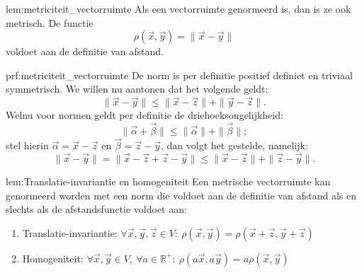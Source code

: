 \begin{lem}{lem:metriciteit_vectorruimte}
    Als een vectorruimte genormeerd is, dan is ze ook metrisch. De functie
    \begin{equation*}
        \rho(\vec{x},\vec{y}) = \|\vec{x} - \vec{y}\|
    \end{equation*}
    voldoet aan de definitie van afstand.
\end{lem}

\newpage

\begin{prf}{prf:metriciteit_vectorruimte}
    De norm is per definitie positief definiet en triviaal symmetrisch. We willen nu aantonen dat het volgende geldt:
    \begin{equation*}
        \| \vec{x} - \vec{y} \| \leq \| \vec{x} - \vec{z} \| + \| \vec{y} - \vec{z} \|.
    \end{equation*}
    Welnu voor normen geldt per definitie de driehoeksongelijkheid:
    \begin{equation*}
        \|\vec{\alpha} + \vec{\beta}\| \leq \|\vec{\alpha}\| + \|\vec{\beta}\|;
    \end{equation*}
    stel hierin $\vec{\alpha} = \vec{x} - \vec{z}$ en $\vec{\beta} = \vec{z} - \vec{y}$, dan volgt het gestelde, namelijk:
    \begin{equation*}
        \|\vec{x} - \vec{y}\| = \|\vec{x} - \vec{z} + \vec{z} - \vec{y}\| \leq \|\vec{x} - \vec{z}\| + \|\vec{z} - \vec{y}\|.
    \end{equation*}
    \vspace{-0.5cm}
\end{prf}

\begin{lem}{lem:Translatie-invariantie en homogeniteit}
    Een metrische vectorruimte kan genormeerd worden met een norm die voldoet aan de definitie van afstand als en slechts als de afstandsfunctie voldoet aan:
    \begin{enumerate}
        \item Translatie-invariantie: $\forall \vec{x},\vec{y},\vec{z} \in V: \ \rho(\vec{x},\vec{y}) = \rho(\vec{x} + \vec{z},\vec{y} + \vec{z})$
        \item Homogeniteit: $\forall \vec{x},\vec{y} \in V,\ \forall a \in \mathbb{R}^+: \ \rho(a\vec{x},a\vec{y}) = a\rho(\vec{x},\vec{y})$
    \end{enumerate}
\end{lem}

